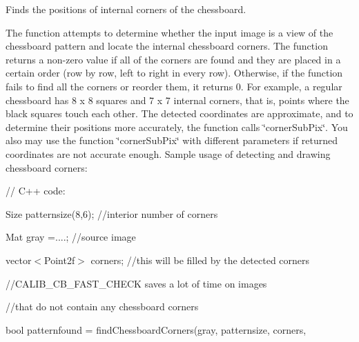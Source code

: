 Finds the positions of internal corners of the chessboard.

The function attempts to determine whether the input image is a view of the chessboard pattern and locate the internal chessboard corners. The function returns a non-\/zero value if all of the corners are found and they are placed in a certain order (row by row, left to right in every row). Otherwise, if the function fails to find all the corners or reorder them, it returns 0. For example, a regular chessboard has 8 x 8 squares and 7 x 7 internal corners, that is, points where the black squares touch each other. The detected coordinates are approximate, and to determine their positions more accurately, the function calls \char`\"{}corner\+Sub\+Pix\char`\"{}. You also may use the function \char`\"{}corner\+Sub\+Pix\char`\"{} with different parameters if returned coordinates are not accurate enough. Sample usage of detecting and drawing chessboard corners\+: {\ttfamily }

{\ttfamily }

{\ttfamily }

{\ttfamily // C++ code\+:}

{\ttfamily }

{\ttfamily }

{\ttfamily Size patternsize(8,6); //interior number of corners}

{\ttfamily }

{\ttfamily }

{\ttfamily Mat gray =....; //source image}

{\ttfamily }

{\ttfamily }

{\ttfamily vector$<$\+Point2f$>$ corners; //this will be filled by the detected corners}

{\ttfamily }

{\ttfamily }

{\ttfamily //\+C\+A\+L\+I\+B\+\_\+\+C\+B\+\_\+\+F\+A\+S\+T\+\_\+\+C\+H\+E\+CK saves a lot of time on images}

{\ttfamily }

{\ttfamily }

{\ttfamily //that do not contain any chessboard corners}

{\ttfamily }

{\ttfamily }

{\ttfamily bool patternfound = find\+Chessboard\+Corners(gray, patternsize, corners,}

{\ttfamily }

{\ttfamily }

